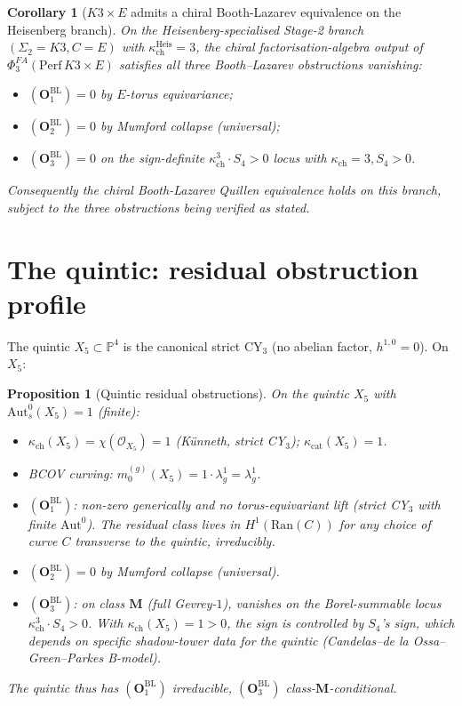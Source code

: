 \documentclass[11pt]{amsart}
\newtheorem{proposition}[theorem]{Proposition}
\newtheorem{corollary}[theorem]{Corollary}
\newcommand{\kch}{\kappa_{\mathrm{ch}}}
\newcommand{\kcat}{\kappa_{\mathrm{cat}}}
\newcommand{\cO}{\mathcal{O}}
\newcommand{\Ran}{\mathrm{Ran}}
\newcommand{\Perf}{\mathrm{Perf}}
\newcommand{\bP}{\mathbb{P}}
\newcommand{\Aut}{\mathrm{Aut}}
\begin{document}
\begin{corollary}[$K3\times E$ admits a chiral Booth-Lazarev
equivalence on the Heisenberg branch]
\label{cor:k3xe-chiral-BL-exists}
On the Heisenberg-specialised Stage-2 branch
$(\Sigma_2 = K3, C = E)$ with $\kch^{\mathrm{Heis}} = 3$, the
chiral factorisation-algebra output of
$\Phi^{FA}_3(\Perf\,K3\times E)$ satisfies all three
Booth--Lazarev obstructions vanishing:
\begin{itemize}[leftmargin=2em]
\item $(\mathbf{O}_1^{\mathrm{BL}}) = 0$ by $E$-torus equivariance;
\item $(\mathbf{O}_2^{\mathrm{BL}}) = 0$ by Mumford collapse
(universal);
\item $(\mathbf{O}_3^{\mathrm{BL}}) = 0$ on the sign-definite
$\kch^3 \cdot S_4 > 0$ locus with $\kch = 3, S_4 > 0$.
\end{itemize}
Consequently the chiral Booth-Lazarev Quillen equivalence holds on
this branch, subject to the three obstructions being verified as
stated.
\end{corollary}

\section{The quintic: residual obstruction profile}
\label{sec:quintic-residual}

The quintic $X_5 \subset \bP^4$ is the canonical strict CY$_3$ (no
abelian factor, $h^{1,0} = 0$). On $X_5$:

\begin{proposition}[Quintic residual obstructions]
\label{prop:quintic-residual}
On the quintic $X_5$ with $\Aut^0_s(X_5) = 1$ (finite):
\begin{itemize}[leftmargin=2em]
\item $\kch(X_5) = \chi(\cO_{X_5}) = 1$ (Künneth, strict CY$_3$);
$\kcat(X_5) = 1$.
\item BCOV curving: $m_0^{(g)}(X_5) = 1 \cdot \lambda_g^1
= \lambda_g^1$.
\item $(\mathbf{O}_1^{\mathrm{BL}})$: non-zero generically and no
torus-equivariant lift (strict CY$_3$ with finite $\Aut^0$).
The residual class lives in $H^1(\Ran(C))$ for any choice of
curve $C$ transverse to the quintic, irreducibly.
\item $(\mathbf{O}_2^{\mathrm{BL}}) = 0$ by Mumford collapse
(universal).
\item $(\mathbf{O}_3^{\mathrm{BL}})$: on class $\mathbf{M}$
(full Gevrey-$1$), vanishes on the Borel-summable locus
$\kch^3 \cdot S_4 > 0$. With $\kch(X_5) = 1 > 0$, the sign is
controlled by $S_4$'s sign, which depends on specific
shadow-tower data for the quintic (Candelas--de la Ossa--Green--Parkes
B-model).
\end{itemize}
The quintic thus has $(\mathbf{O}_1^{\mathrm{BL}})$ irreducible,
$(\mathbf{O}_3^{\mathrm{BL}})$ class-$\mathbf{M}$-conditional.
\end{proposition}
\end{document}
